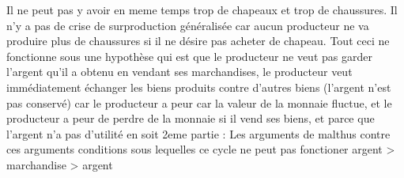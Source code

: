 \documentclass{article}
\begin{document}
Il ne peut pas y avoir en meme temps trop de chapeaux et trop de chaussures. Il n'y a pas de crise de surproduction généralisée car aucun producteur ne va produire plus de chaussures si il ne désire pas acheter de chapeau. Tout ceci ne fonctionne sous une hypothèse qui est que le producteur ne veut pas garder l'argent qu'il a obtenu en vendant ses marchandises, le producteur veut immédiatement échanger les biens produits contre d'autres biens (l'argent n'est pas conservé) car le producteur a peur car la valeur de la monnaie fluctue, et le producteur a peur de perdre de la monnaie si il vend ses biens, et parce que l'argent n'a pas d'utilité en soit 
2eme partie : Les arguments de malthus contre ces arguments conditions sous lequelles ce cycle ne peut pas fonctioner argent > marchandise > argent 
\end{document}
